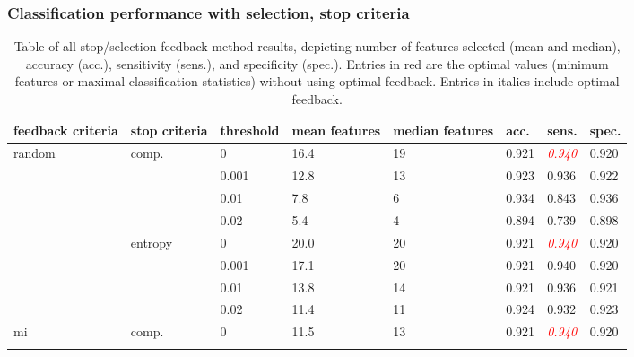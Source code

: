 \subsubsection{Classification performance with selection, stop criteria}
\begin{table}[h]
	\centering
	\caption[Feedback system performance]{Table of all stop/selection feedback method results, depicting number of features selected (mean and median), accuracy (acc.), sensitivity (sens.), and specificity (spec.). Entries in red are the optimal values (minimum features or maximal classification statistics) without using optimal feedback. Entries in italics include optimal feedback.}
	\label{table:feedback_perf}
	\begin{tabularx}{\textwidth}{|X|X|X|X|X|X|X|X|}
		\hline
		feedback criteria        & stop criteria            & threshold & mean features & median features  & acc.           & sens.                & spec.          \\ \hline
		\multirow{8}{*}{random}  & \multirow{4}{*}{comp.}   & 0         & 16.4          & 19               & 0.921          & \textcolor{red}{\textit{0.940}}      & 0.920          \\ \cline{3-8} 
		&                          & 0.001     & 12.8          & 13               & 0.923          & 0.936                & 0.922          \\ \cline{3-8} 
		&                          & 0.01      & 7.8           & 6                & 0.934          & 0.843                & 0.936          \\ \cline{3-8} 
		&                          & 0.02      & 5.4           & 4                & 0.894          & 0.739                & 0.898          \\ \cline{2-8} 
		& \multirow{4}{*}{entropy} & 0         & 20.0          & 20               & 0.921          & \textcolor{red}{\textit{0.940}}       & 0.920          \\ \cline{3-8} 
		&                          & 0.001     & 17.1          & 20               & 0.921          & 0.940                & 0.920          \\ \cline{3-8} 
		&                          & 0.01      & 13.8          & 14               & 0.921          & 0.936                & 0.921          \\ \cline{3-8} 
		&                          & 0.02      & 11.4          & 11               & 0.924          & 0.932                & 0.923          \\ \hline
		\multirow{8}{*}{mi}      & \multirow{4}{*}{comp.}   & 0         & 11.5          & 13               & 0.921          & \textcolor{red}{\textit{0.940}} & 0.920          \\ \cline{3-8} 

\end{tabularx}
\end{table}
